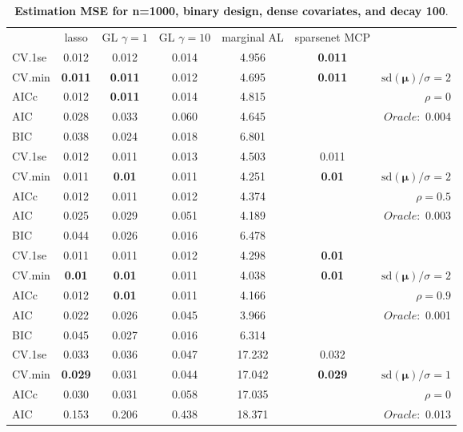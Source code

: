 \clearpage
\begin{table}\vspace{-.5cm}
\caption[l]{ { \bf Estimation MSE for n=1000, binary design, 
dense covariates, and  decay  100}.}
\vspace{-.5cm}
\footnotesize{}
\begin{center}
\begin{tabular}{l*{5}{c}|r}
& lasso & GL $\gamma=1$ & GL $\gamma=10$ & marginal AL & sparsenet MCP  & \\
 \cline{1-7}
CV.1se & 0.012 & 0.012 & 0.014 & 4.956 & {\bf 0.011} & \\
CV.min & {\bf 0.011} & {\bf 0.011} & 0.012 & 4.695 & {\bf 0.011} &  $\mathrm{sd}(\mathbf{\mu})/\sigma=2$ \\
AICc & 0.012 & {\bf 0.011} & 0.014 & 4.815 & & $\rho=0$ \\
AIC & 0.028 & 0.033 & 0.060 & 4.645 & &  \multirow{2}{*}{$Oracle: $ 0.004} \\
BIC & 0.038 & 0.024 & 0.018 & 6.801 & &  \\
 \hline 
CV.1se & 0.012 & 0.011 & 0.013 & 4.503 & 0.011 & \\
CV.min & 0.011 & {\bf 0.01} & 0.011 & 4.251 & {\bf 0.01} &  $\mathrm{sd}(\mathbf{\mu})/\sigma=2$ \\
AICc & 0.012 & 0.011 & 0.012 & 4.374 & & $\rho=0.5$ \\
AIC & 0.025 & 0.029 & 0.051 & 4.189 & &  \multirow{2}{*}{$Oracle: $ 0.003} \\
BIC & 0.044 & 0.026 & 0.016 & 6.478 & &  \\
 \hline 
CV.1se & 0.011 & 0.011 & 0.012 & 4.298 & {\bf 0.01} & \\
CV.min & {\bf 0.01} & {\bf 0.01} & 0.011 & 4.038 & {\bf 0.01} &  $\mathrm{sd}(\mathbf{\mu})/\sigma=2$ \\
AICc & 0.012 & {\bf 0.01} & 0.011 & 4.166 & & $\rho=0.9$ \\
AIC & 0.022 & 0.026 & 0.045 & 3.966 & &  \multirow{2}{*}{$Oracle: $ 0.001} \\
BIC & 0.045 & 0.027 & 0.016 & 6.314 & &  \\
 \hline 
CV.1se & 0.033 & 0.036 & 0.047 & 17.232 & 0.032 & \\
CV.min & {\bf 0.029} & 0.031 & 0.044 & 17.042 & {\bf 0.029} &  $\mathrm{sd}(\mathbf{\mu})/\sigma=1$ \\
AICc & 0.030 & 0.031 & 0.058 & 17.035 & & $\rho=0$ \\
AIC & 0.153 & 0.206 & 0.438 & 18.371 & &  \multirow{2}{*}{$Oracle: $ 0.013} \\

\end{tabular}
\end{center}
\end{table}
